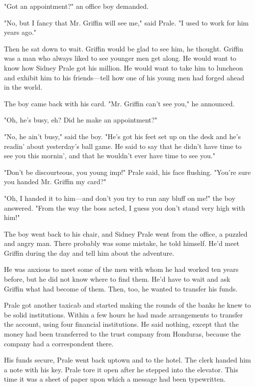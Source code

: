 \documentclass{novel}
\begin{document}
"Got an appointment?" an office boy demanded.

"No, but I fancy that Mr. Griffin will see me," said Prale. "I used to work for him years ago."

Then he sat down to wait. Griffin would be glad to see him, he thought. Griffin was a man who always liked to see younger men get along. He would want to know how Sidney Prale got his million. He would want to take him to luncheon and exhibit him to his friends---tell how one of his young men had forged ahead in the world.

The boy came back with his card. "Mr. Griffin can't see you," he announced.

"Oh, he's busy, eh? Did he make an appointment?"

"No, he ain't busy," said the boy. "He's got his feet set up on the desk and he's readin' about yesterday's ball game. He said to say that he didn't have time to see you this mornin', and that he wouldn't ever have time to see you."

"Don't be discourteous, you young imp!" Prale said, his face flushing. "You're sure you handed Mr. Griffin my card?"

"Oh, I handed it to him---and don't you try to run any bluff on me!" the boy answered. "From the way the boss acted, I guess you don't stand very high with him!"

The boy went back to his chair, and Sidney Prale went from the office, a puzzled and angry man. There probably was some mistake, he told himself. He'd meet Griffin during the day and tell him about the adventure.

He was anxious to meet some of the men with whom he had worked ten years before, but he did not know where to find them. He'd have to wait and ask Griffin what had become of them. Then, too, he wanted to transfer his funds.

Prale got another taxicab and started making the rounds of the banks he knew to be solid institutions. Within a few hours he had made arrangements to transfer the account, using four financial institutions. He said nothing, except that the money had been transferred to the trust company from Honduras, because the company had a correspondent there.

His funds secure, Prale went back uptown and to the hotel. The clerk handed him a note with his key. Prale tore it open after he stepped into the elevator. This time it was a sheet of paper upon which a message had been typewritten.
\end{document}
